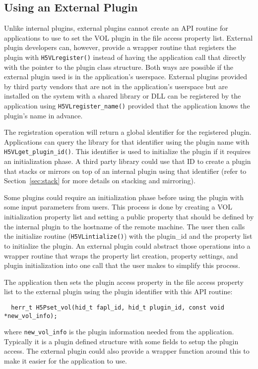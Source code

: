 \subsection{Using an External Plugin}
Unlike internal plugins, external plugins cannot create an API routine for applications to use to set the VOL plugin in the file access property list. External plugin developers can, however, provide a wrapper routine that registers the plugin with {\tt H5VLregister()} instead of having the application call that directly with the pointer to the plugin class structure. Both ways are possible if the external plugin used is in the application's userspace. External plugins provided by third party vendors that are not in the application's userspace but are installed on the system with a shared library or DLL can be registered by the application using {\tt H5VLregister\_name()} provided that the application knows the plugin's name in advance.

The registration operation will return a global identifier for the registered plugin. Applications can query the library for that identifier using the plugin name with {\tt H5VLget\_plugin\_id()}. This identifier is used to initialize the plugin if it requires an initialization phase. A third party library could use that ID to create a plugin that stacks or mirrors on top of an internal plugin using that identifier (refer to Section~\ref{sec:stack} for more details on stacking and mirroring).

Some plugins could require an initialization phase before using the plugin with some input parameters from users. This process is done by creating a VOL initialization property list and setting a public property that should be defined by the internal plugin to the hostname of the remote machine. The user then calls the initialize routine ({\tt H5VLintialize()}) with the plugin\_id and the property list to initialize the plugin. An external plugin could abstract those operations into a wrapper routine that wraps the property list creation, property settings, and plugin initialization into one call that the user makes to simplify this process.

The application then sets the plugin access property in the file access property list to the external plugin using the plugin identifier with this API routine:
\begin{lstlisting}
  herr_t H5Pset_vol(hid_t fapl_id, hid_t plugin_id, const void *new_vol_info);
\end{lstlisting}
where {\tt new\_vol\_info} is the plugin information needed from the application. Typically it is a plugin defined structure with some fields to setup the plugin access. The external plugin could also provide a wrapper function around this to make it easier for the application to use. 

